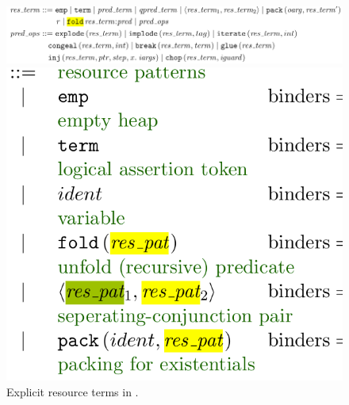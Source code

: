 \begin{figure}[tbp]
    \centering
    \begin{minipage}{\textwidth}
        \includegraphics{figures/kernel-res-term-def}
    \end{minipage}%
    \begin{minipage}{0.4\textwidth}
        \includegraphics{figures/kernel-res-pat}
    \end{minipage}
    \caption{Explicit resource terms in .}\label{fig:res-terms}
\end{figure}

